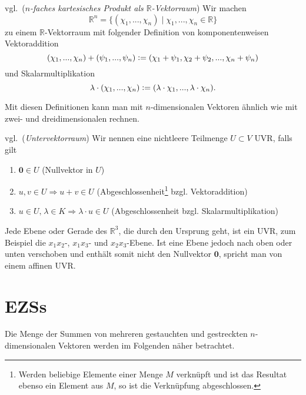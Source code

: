 \begin{definition}vgl.\,\cite[S. 28, 6.2]{Skript} (\emph{$n$-faches kartesisches Produkt als $\mathbb{R}$-Vektorraum}) Wir machen 
\[ \mathbb{R}^n = \{(\chi_1,...,\chi_n) \mid \chi_1,...,\chi_n \in \mathbb{R}\}\]
zu einem $\mathbb{R}$-Vektorraum mit folgender Definition von komponentenweisen Vektoraddition
\[(\chi_1,...,\chi_n)+(\psi_1,...,\psi_n) \vcentcolon= (\chi_1 + \psi_1,\chi_2 + \psi_2,..., \chi_n + \psi_n)\]
und Skalarmultiplikation
\[\lambda \cdot (\chi_1,...,\chi_n)\vcentcolon= (\lambda \cdot \chi_1,...,\lambda \cdot \chi_n)\text{.}\]
\end{definition}
Mit diesen Definitionen kann man mit $n$-dimensionalen Vektoren ähnlich wie mit zwei- und dreidimensionalen rechnen. %

\begin{definition}vgl.\,\cite[S. 298]{Tut} (\emph{Untervektorraum})\label{UVR} Wir nennen eine nichtleere Teilmenge $U \subset V$ \acl{UVR}, falls gilt 
\begin{enumerate}
\item  $\textbf{0} \in U$ (Nullvektor in $U$)
\item $u,v \in U \Rightarrow u + v \in U$ (Abgeschlossenheit\footnote{Werden beliebige Elemente einer Menge $M$ verknüpft und ist das Resultat ebenso ein Element aus $M$, so ist die Verknüpfung abgeschlossen.} bzgl. Vektoraddition)
\item $u \in U \text{,} \; \lambda \in K \Rightarrow \lambda \cdot u \in U$ (Abgeschlossenheit bzgl. Skalarmultiplikation)
\end{enumerate} 
\end{definition}

\begin{example}
Jede Ebene oder Gerade des $\mathbb{R}^3$, die durch den Ursprung geht, ist ein \acl{UVR}, zum Beispiel die $x_1x_2$-, $x_1x_3$- und $x_2x_3$-Ebene. Ist eine Ebene jedoch nach oben oder unten verschoben und enthält somit nicht den Nullvektor $\textbf{0}$, spricht man von einem affinen \acl{UVR}. 
\end{example}
\newpage
\section{\aclp{EZS}}
\label{Erz}
Die Menge der Summen von mehreren gestauchten und gestreckten $n$-dimensionalen Vektoren werden im Folgenden näher betrachtet. 

